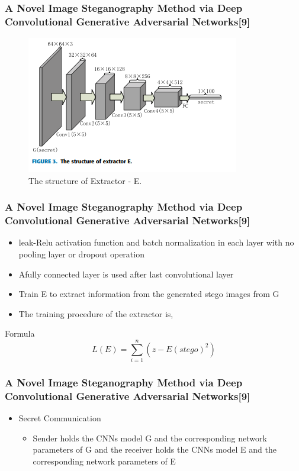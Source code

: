 \documentclass{beamer} %
\theoremstyle{definition} %
\begin{document}
\begin{frame}
\frametitle{A Novel Image Steganography Method via Deep Convolutional Generative Adversarial Networks[9]  }
\begin{figure}
	\includegraphics[scale=0.55]{extractorgan.png}
	\caption{The structure of Extractor - E. }
\end{figure}
\end{frame}

\begin{frame}
\frametitle{A Novel Image Steganography Method via Deep Convolutional Generative Adversarial Networks[9] }
\begin{itemize}
    \item  leak-Relu activation function and batch normalization in each layer with no pooling layer or dropout operation   
    \item Afully connected layer is used after last convolutional layer  
    \item Train E to extract information from the generated stego images from G   \item The training procedure of the extractor is,
\end{itemize}
\begin{block}{Formula}
	\begin{equation}
	L(E) = \sum_{i=1}^{n} (z - E(stego)^2)
	\end{equation}
\end{block}
\end{frame}

\begin{frame}
\frametitle{A Novel Image Steganography Method via Deep Convolutional Generative Adversarial Networks[9]  }
\begin{itemize}
	\item  Secret Communication 
	\begin{itemize}
		\item Sender holds the CNNs model G and the corresponding network parameters of G and the receiver holds the CNNs model E and the corresponding network parameters of E 
	\end{itemize}
\end{itemize}
\end{frame}
\end{document}
